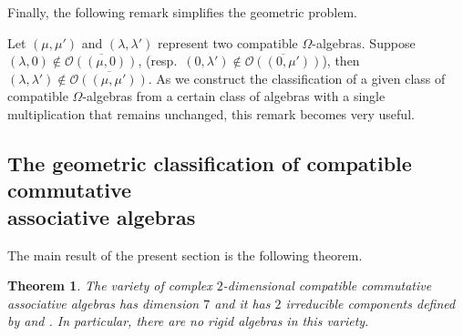 \documentclass[10pt,a4paper]{amsart}
\numberwithin{equation}{section}
\newtheorem{Theorem}{Theorem}[section]
\begin{document}
Finally, the following remark simplifies the geometric problem.

\begin{Remark}\label{remrem}
 Let $(\mu, \mu')$ and $(\lambda, \lambda')$ represent two compatible $\Omega$-algebras. Suppose $(\lambda, 0)\not\in\overline{{\mathcal O}((\mu, 0))}$, (resp.\ $(0, \lambda')\not\in\overline{{\mathcal O}((0, \mu'))}$), then $(\lambda, \lambda')\not\in\overline{{\mathcal O}((\mu, \mu'))}$.
 As we construct the classification of a given class of compatible $\Omega$-algebras from a certain class of algebras with a single multiplication that remains unchanged, this remark becomes very useful.
\end{Remark}

\subsection[The geometric classification of compatible commutative associative algebras]{The geometric classification of compatible commutative\\ associative algebras}
The main result of the present section is the following theorem.

\begin{Theorem}\label{geo2}
The variety of complex $2$-dimensional compatible commutative associative algebras has
dimension $7$ and it has $2$ irreducible components defined by
 and
.
In particular, there are no rigid algebras in this variety.
\end{Theorem}
\end{document}
